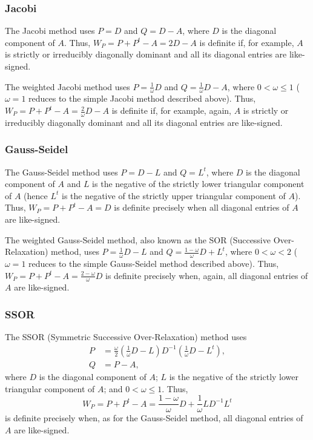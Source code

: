 \documentclass{article}
\begin{document}
\subsubsection{Jacobi}

The Jacobi method uses $P = D$ and $Q = D - A$, where $D$ is the diagonal component of $A$. Thus, $W_P = P + P^t - A = 2 D - A$ is definite if, for example, $A$ is strictly or irreducibly diagonally dominant and all its diagonal entries are like-signed.

The weighted Jacobi method uses $P = \frac{1}{\omega} D$ and $Q = \frac{1}{\omega} D - A$, where $0 < \omega \leq 1$ ($\omega = 1$ reduces to the simple Jacobi method described above). Thus, $W_P = P + P^t - A = \frac{2}{\omega} D - A$ is definite if, for example, again, $A$ is strictly or irreducibly diagonally dominant and all its diagonal entries are like-signed.

\subsubsection{Gauss-Seidel}

The Gauss-Seidel method uses $P = D - L$ and $Q = L^t$, where $D$ is the diagonal component of $A$ and $L$ is the negative of the strictly lower triangular component of $A$ (hence $L^t$ is the negative of the strictly upper triangular component of $A$). Thus, $W_P = P + P^t - A = D$ is definite precisely when all diagonal entries of $A$ are like-signed.

The weighted Gauss-Seidel method, also known as the SOR (Successive Over-Relaxation) method, uses $P = \frac{1}{\omega} D - L$ and $Q = \frac{1 - \omega}{\omega} D + L^t$, where $0 < \omega < 2$ ($\omega = 1$ reduces to the simple Gauss-Seidel method described above). Thus, $W_P = P + P^t - A = \frac{2 - \omega}{\omega} D$ is definite precisely when, again, all diagonal entries of $A$ are like-signed.

\subsubsection{SSOR}

The SSOR (Symmetric Successive Over-Relaxation) method uses
\begin{align*}
P & =  \frac{\omega}{2} \left( \frac{1}{\omega} D - L \right) D^{-1} \left( \frac{1}{\omega} D - L^t \right), \\
Q & = P - A,
\end{align*}
where $D$ is the diagonal component of $A$; $L$ is the negative of the strictly lower triangular component of $A$; and $0 < \omega \leq 1$. Thus,
\begin{equation*}
W_P = P + P^t - A = \frac{1 - \omega}{\omega} D + \frac{1}{\omega} L D^{-1} L^t
\end{equation*}
is definite precisely when, as for the Gauss-Seidel method, all diagonal entries of $A$ are like-signed.
\end{document}
